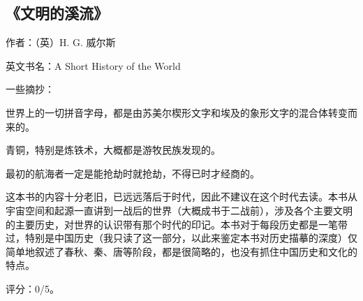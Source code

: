 \subsection{《文明的溪流》}

作者：（英）H. G. 威尔斯

英文书名：A Short History of the World

一些摘抄：
\begin{itemize*}
    \item 世界上的一切拼音字母，都是由苏美尔楔形文字和埃及的象形文字的混合体转变而来的。
    \item 青铜，特别是炼铁术，大概都是游牧民族发现的。
    \item 最初的航海者一定是能抢劫时就抢劫，不得已时才经商的。
\end{itemize*}

这本书的内容十分老旧，已远远落后于时代，因此不建议在这个时代去读。本书从宇宙空间和起源一直讲到一战后的世界（大概成书于二战前），涉及各个主要文明的主要历史，对世界的认识带有那个时代的印记。本书对于每段历史都是一笔带过，特别是中国历史（我只读了这一部分，以此来鉴定本书对历史描摹的深度）仅简单地叙述了春秋、秦、唐等阶段，都是很简略的，也没有抓住中国历史和文化的特点。

评分：0/5。